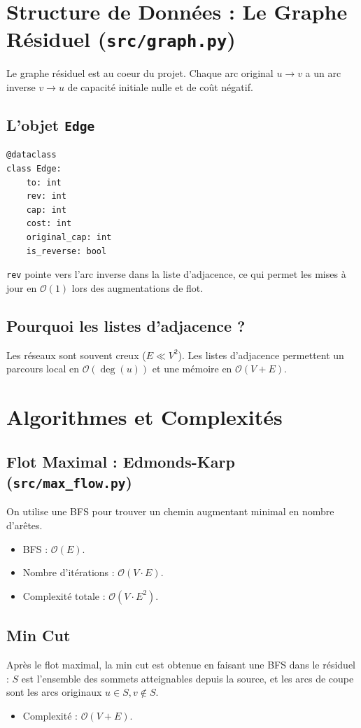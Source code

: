 \documentclass[11pt,a4paper]{article}
\begin{document}
\section{Structure de Donn\'ees : Le Graphe R\'esiduel (\texttt{src/graph.py})}
Le graphe r\'esiduel est au coeur du projet. Chaque arc original $u \to v$ a un arc inverse $v \to u$ de capacit\'e initiale nulle et de co\^ut n\'egatif.

\subsection{L'objet \texttt{Edge}}
\begin{verbatim}
@dataclass
class Edge:
    to: int
    rev: int
    cap: int
    cost: int
    original_cap: int
    is_reverse: bool
\end{verbatim}
\texttt{rev} pointe vers l'arc inverse dans la liste d'adjacence, ce qui permet les mises \`a jour en $\mathcal{O}(1)$ lors des augmentations de flot.

\subsection{Pourquoi les listes d'adjacence ?}
Les r\'eseaux sont souvent creux ($E \ll V^2$). Les listes d'adjacence permettent un parcours local en $\mathcal{O}(\deg(u))$ et une m\'emoire en $\mathcal{O}(V+E)$.

\section{Algorithmes et Complexit\'es}
\subsection{Flot Maximal : Edmonds-Karp (\texttt{src/max\_flow.py})}
On utilise une BFS pour trouver un chemin augmentant minimal en nombre d'ar\^etes.
\begin{itemize}
    \item BFS : $\mathcal{O}(E)$.
    \item Nombre d'it\'erations : $\mathcal{O}(V \cdot E)$.
    \item Complexit\'e totale : $\mathcal{O}(V \cdot E^2)$.
\end{itemize}

\subsection{Min Cut}
Apr\`es le flot maximal, la min cut est obtenue en faisant une BFS dans le r\'esiduel :
$S$ est l'ensemble des sommets atteignables depuis la source, et les arcs de coupe sont les arcs originaux $u \in S, v \notin S$.
\begin{itemize}
    \item Complexit\'e : $\mathcal{O}(V+E)$.
\end{itemize}
\end{document}
